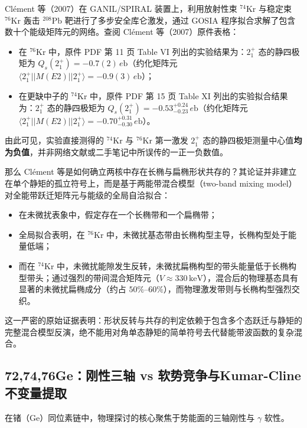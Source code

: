 Clément 等（2007）\cite{doctoral-r1-g27-clement-2007-prc-krypton-coulex}在 GANIL/SPIRAL 装置上，利用放射性束 $^{74}\mathrm{Kr}$ 与稳定束 $^{76}\mathrm{Kr}$ 轰击 $^{208}\mathrm{Pb}$ 靶进行了多步安全库仑激发，通过 GOSIA 程序拟合求解了包含数十个能级矩阵元的网络。查阅 Clément 等（2007）原件表格：
\begin{itemize}
\item 在 $^{76}\mathrm{Kr}$ 中，原件 PDF 第 11 页 Table VI 列出的实验结果为：$2^+_1$ 态的静四极矩为 $Q_s(2^+_1) = -0.7(2)\,e\mathrm{b}$（约化矩阵元 $\langle 2^+_1 || M(E2) || 2^+_1 \rangle = -0.9(3)\,e\mathrm{b}$）；
\item 在更缺中子的 $^{74}\mathrm{Kr}$ 中，原件 PDF 第 15 页 Table XI 列出的实验拟合结果为：$2^+_1$ 态的静四极矩为 $Q_s(2^+_1) = -0.53^{+0.24}_{-0.23}\,e\mathrm{b}$（约化矩阵元 $\langle 2^+_1 || M(E2) || 2^+_1 \rangle = -0.70^{+0.31}_{-0.30}\,e\mathrm{b}$）。
\end{itemize}
由此可见，实验直接测得的 $^{74}\mathrm{Kr}$ 与 $^{76}\mathrm{Kr}$ 第一激发 $2^+_1$ 态的静四极矩测量中心值\textbf{均为负值}，并非网络文献或二手笔记中所误传的一正一负数值。

那么 Clément 等是如何确立两核中存在长椭与扁椭形状共存的？其论证并非建立在单个静矩的孤立符号上，而是基于两能带混合模型（two-band mixing model）对全能带跃迁矩阵元与能级的全局自洽拟合：
\begin{itemize}
\item 在未微扰表象中，假定存在一个长椭带和一个扁椭带；
\item 全局拟合表明，在 $^{76}\mathrm{Kr}$ 中，未微扰基态带由长椭构型主导，长椭构型处于能量低端；
\item 而在 $^{74}\mathrm{Kr}$ 中，未微扰能隙发生反转，未微扰扁椭构型的带头能量低于长椭构型带头；通过强烈的带间混合矩阵元（$V \approx 330\,\mathrm{keV}$），混合后的物理基态具有显著的未微扰扁椭成分（约占 $50\%\text{--}60\%$），而物理激发带则与长椭构型强烈交织。
\end{itemize}
这一严密的原始证据表明：形状反转与共存的判定依赖于包含多个态跃迁与静矩的完整混合模型反演，绝不能用对角单态静矩的简单符号去代替能带波函数的复杂混合。

\subsection{72,74,76Ge：刚性三轴 vs 软势竞争与Kumar-Cline不变量提取}\label{sec:4-2-4}

在锗（$\mathrm{Ge}$）同位素链中，物理探讨的核心聚焦于势能面的三轴刚性与 $\gamma$ 软性。


